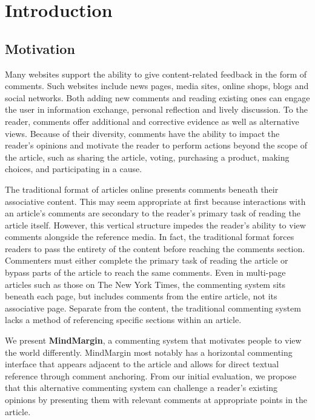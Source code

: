 \section{Introduction}

\subsection{Motivation}
Many websites support the ability to give content-related feedback in the form of comments. Such websites include news pages, media sites, online shops, blogs and social networks. Both adding new comments and reading existing ones can engage the user in information exchange, personal reflection and lively discussion. To the reader, comments offer additional and corrective evidence as well as alternative views. Because of their diversity, comments have the ability to impact the reader's opinions and motivate the reader to perform actions beyond the scope of the article, such as sharing the article, voting, purchasing a product, making choices, and participating in a cause. 

The traditional format of articles online presents comments beneath their associative content. This may seem appropriate at first because interactions with an article's comments are secondary to the reader's primary task of reading the article itself. However, this vertical structure impedes the reader's ability to view comments alongside the reference media. In fact, the traditional format forces readers to pass the entirety of the content before reaching the comments section. Commenters must either complete the primary task of reading the article or bypass parts of the article to reach the same comments. Even in multi-page articles such as those on The New York Times, the commenting system sits beneath each page, but includes comments from the entire article, not its associative page. Separate from the content, the traditional commenting system lacks a method of referencing specific sections within an article.

We present \textbf{MindMargin}, a commenting system that motivates people to view the world differently. MindMargin most notably has a horizontal commenting interface that appears adjacent to the article and allows for direct textual reference through comment anchoring. From our initial evaluation, we propose that this alternative commenting system can challenge a reader's existing opinions by presenting them with relevant comments at appropriate points in the article. 

